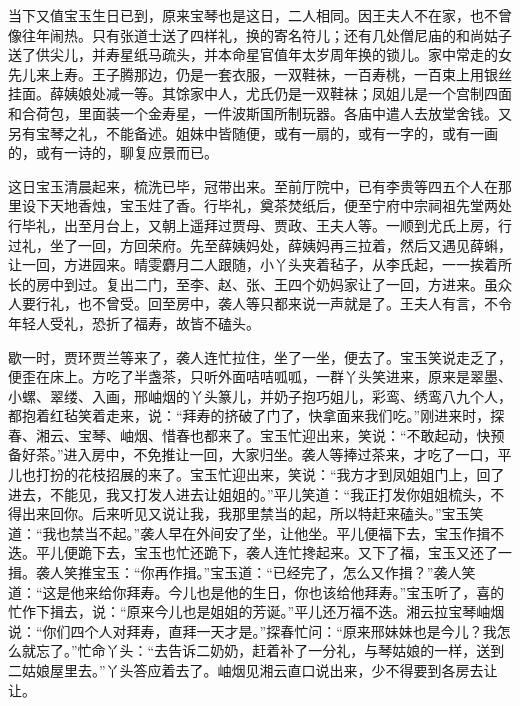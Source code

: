 当下又值宝玉生日已到，原来宝琴也是这日，二人相同。因王夫人不在家，也不曾像往年闹热。只有张道士送了四样礼，换的寄名符儿；还有几处僧尼庙的和尚姑子送了供尖儿，并寿星纸马疏头，并本命星官值年太岁周年换的锁儿。家中常走的女先儿来上寿。王子腾那边，仍是一套衣服，一双鞋袜，一百寿桃，一百束上用银丝挂面。薛姨娘处减一等。其馀家中人，尤氏仍是一双鞋袜；凤姐儿是一个宫制四面和合荷包，里面装一个金寿星，一件波斯国所制玩器。各庙中遣人去放堂舍钱。又另有宝琴之礼，不能备述。姐妹中皆随便，或有一扇的，或有一字的，或有一画的，或有一诗的，聊复应景而已。

这日宝玉清晨起来，梳洗已毕，冠带出来。至前厅院中，已有李贵等四五个人在那里设下天地香烛，宝玉炷了香。行毕礼，奠茶焚纸后，便至宁府中宗祠祖先堂两处行毕礼，出至月台上，又朝上遥拜过贾母、贾政、王夫人等。一顺到尤氏上房，行过礼，坐了一回，方回荣府。先至薛姨妈处，薛姨妈再三拉着，然后又遇见薛蝌，让一回，方进园来。晴雯麝月二人跟随，小丫头夹着毡子，从李氏起，一一挨着所长的房中到过。复出二门，至李、赵、张、王四个奶妈家让了一回，方进来。虽众人要行礼，也不曾受。回至房中，袭人等只都来说一声就是了。王夫人有言，不令年轻人受礼，恐折了福寿，故皆不磕头。

歇一时，贾环贾兰等来了，袭人连忙拉住，坐了一坐，便去了。宝玉笑说走乏了，便歪在床上。方吃了半盏茶，只听外面咭咭呱呱，一群丫头笑进来，原来是翠墨、小螺、翠缕、入画，邢岫烟的丫头篆儿，并奶子抱巧姐儿，彩鸾、绣鸾八九个人，都抱着红毡笑着走来，说：``拜寿的挤破了门了，快拿面来我们吃。''刚进来时，探春、湘云、宝琴、岫烟、惜春也都来了。宝玉忙迎出来，笑说：``不敢起动，快预备好茶。''进入房中，不免推让一回，大家归坐。袭人等捧过茶来，才吃了一口，平儿也打扮的花枝招展的来了。宝玉忙迎出来，笑说：``我方才到凤姐姐门上，回了进去，不能见，我又打发人进去让姐姐的。''平儿笑道：``我正打发你姐姐梳头，不得出来回你。后来听见又说让我，我那里禁当的起，所以特赶来磕头。''宝玉笑道：``我也禁当不起。''袭人早在外间安了坐，让他坐。平儿便福下去，宝玉作揖不迭。平儿便跪下去，宝玉也忙还跪下，袭人连忙搀起来。又下了福，宝玉又还了一揖。袭人笑推宝玉：``你再作揖。''宝玉道：``已经完了，怎么又作揖？''袭人笑道：``这是他来给你拜寿。今儿也是他的生日，你也该给他拜寿。''宝玉听了，喜的忙作下揖去，说：``原来今儿也是姐姐的芳诞。''平儿还万福不迭。湘云拉宝琴岫烟说：``你们四个人对拜寿，直拜一天才是。''探春忙问：``原来邢妹妹也是今儿？我怎么就忘了。''忙命丫头：``去告诉二奶奶，赶着补了一分礼，与琴姑娘的一样，送到二姑娘屋里去。''丫头答应着去了。岫烟见湘云直口说出来，少不得要到各房去让让。

